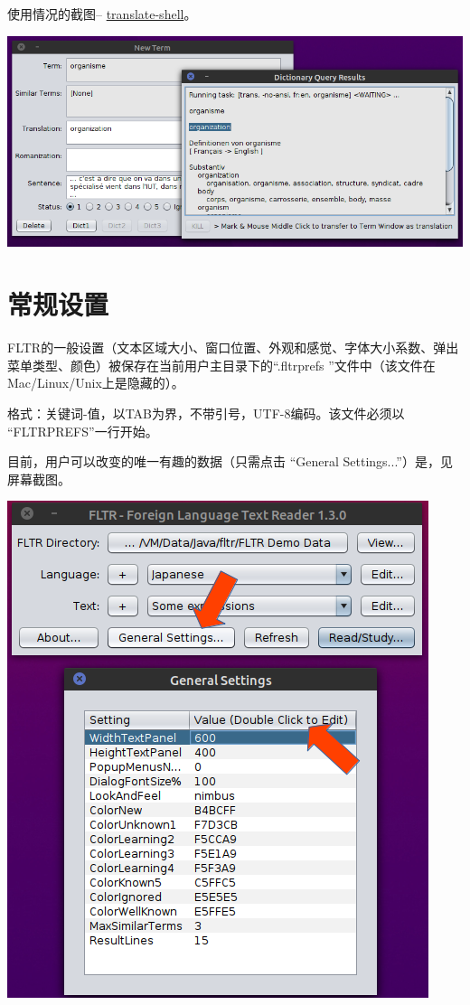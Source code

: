 \documentclass[cn,10pt,math=newtx,citestyle=gb7714-2015,bibstyle=gb7714-2015]{elegantbook}
\newcommand{\translateshell}{\href{https://github.com/soimort/translate-shell}{translate-shell}}
\begin{document}
使用情况的截图-- \translateshell。

\includegraphics[scale=0.4]{image/images-033.png}


\chapter{常规设置}
\label{常规设置}
FLTR的一般设置（文本区域大小、窗口位置、外观和感觉、字体大小系数、弹出菜单类型、颜色）被保存在当前用户主目录下的“.fltrprefs ”文件中（该文件在Mac/Linux/Unix上是隐藏的）。

格式：关键词-值，以TAB为界，不带引号，UTF-8编码。该文件必须以 “FLTRPREFS”一行开始。

目前，用户可以改变的唯一有趣的数据（只需点击 “General Settings...”）是，见屏幕截图。

\includegraphics[scale=0.8]{image/images-034.png}
\end{document}
